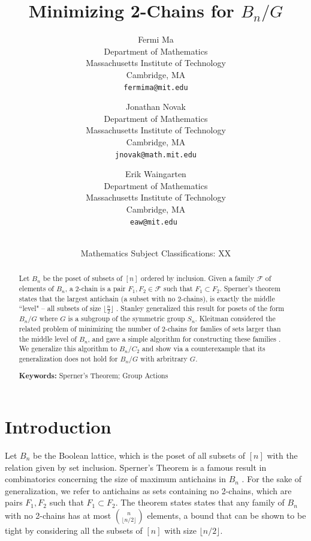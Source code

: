\documentclass[12pt]{article}
\title{\bf Minimizing 2-Chains for $B_n/G$}
\author{
Fermi Ma\\
\small Department of Mathematics\\[-0.8ex]
\small Massachusetts Institute of Technology\\[-0.8ex]
\small Cambridge, MA\\
\small\tt fermima@mit.edu\\
\and
Jonathan Novak\\
\small Department of Mathematics\\[-0.8ex]
\small Massachusetts Institute of Technology\\[-0.8ex]
\small Cambridge, MA\\
\small\tt jnovak@math.mit.edu\\
\and
Erik Waingarten\\
\small Department of Mathematics\\[-0.8ex]
\small Massachusetts Institute of Technology\\[-0.8ex] 
\small Cambridge, MA\\
\small\tt eaw@mit.edu
}
\date{\dateline{August, 2014}{XX}\\
\small Mathematics Subject Classifications: XX}
\theoremstyle{plain}
\theoremstyle{definition}
\theoremstyle{remark}
\newcommand{\F}{\mathcal{F}}
\begin{document}
\maketitle


\begin{abstract}
Let $B_n$ be the poset of subsets of $[n]$ ordered by inclusion. Given a family $\F$ of elements of $B_n$, a 2-chain is a pair $F_1, F_2 \in \F$ such that $F_1 \subset F_2$. Sperner's theorem states that the largest antichain (a subset with no 2-chains), is exactly the middle ``level" -- all subsets of size $\lfloor \frac{n}{2} \rfloor$ \cite{Sperner}. Stanley generalized this result for posets of the form $B_n/G$ where $G$ is a subgroup of the symmetric group $S_n$. Kleitman considered the related problem of minimizing the number of 2-chains for famlies of sets larger than the middle level of $B_n$, and gave a simple algorithm for constructing these families \cite{Kleitman}. We generalize this algorithm to $B_n/C_2$ and show via a counterexample that its generalization does not hold for $B_n/G$ with arbritrary $G$.

  \bigskip\noindent \textbf{Keywords:} Sperner's Theorem; Group Actions\end{abstract}

\section{Introduction}

Let $B_n$ be the Boolean lattice, which is the poset of all subsets of $[n]$ with the relation given by set inclusion. Sperner's Theorem is a famous result in combinatorics concerning the size of maximum antichains in $B_n$ \cite{Sperner}. For the sake of generalization, we refer to antichains as sets containing no 2-chains, which are pairs $F_1, F_2$ such that $F_1 \subset F_2$. The theorem states states that any family of $B_n$ with no 2-chains has at most $\binom{n}{\lfloor n/2 \rfloor}$ elements, a bound that can be shown to be tight by considering all the subsets of $[n]$ with size $\lfloor n/2 \rfloor$.
\end{document}
